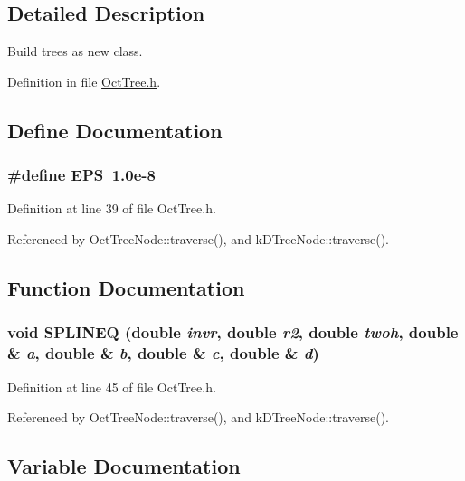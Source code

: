 \subsection{Detailed Description}
Build trees as new class. 

Definition in file \hyperlink{OctTree_8h_source}{OctTree.h}.



\subsection{Define Documentation}
\subsubsection[{EPS}]{\setlength{\rightskip}{0pt plus 5cm}\#define EPS~1.0e-\/8}\label{OctTree_8h_a6ebf6899d6c1c8b7b9d09be872c05aae}


Definition at line 39 of file OctTree.h.



Referenced by OctTreeNode::traverse(), and kDTreeNode::traverse().



\subsection{Function Documentation}
\subsubsection[{SPLINEQ}]{\setlength{\rightskip}{0pt plus 5cm}void SPLINEQ (double {\em invr}, \/  double {\em r2}, \/  double {\em twoh}, \/  double \& {\em a}, \/  double \& {\em b}, \/  double \& {\em c}, \/  double \& {\em d})}\label{OctTree_8h_aa28798c3377498cc832f71c04c1b74bd}


Definition at line 45 of file OctTree.h.



Referenced by OctTreeNode::traverse(), and kDTreeNode::traverse().



\subsection{Variable Documentation}
